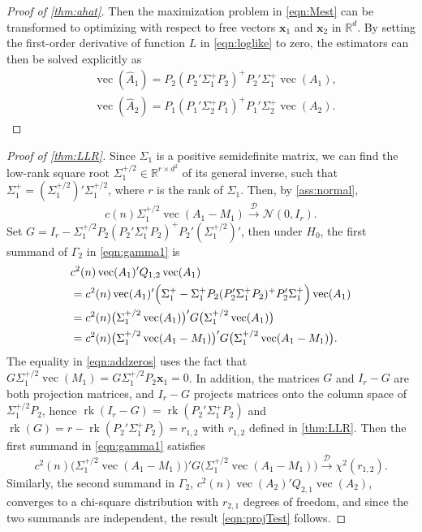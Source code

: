 \documentclass[12pt]{article}
\numberwithin{equation}{section}
\numberwithin{table}{section}
\numberwithin{thm}{section}
\numberwithin{defn}{section}
\numberwithin{lem}{section}
\numberwithin{prop}{section}
\numberwithin{cor}{section}
\numberwithin{rem}{section}
\DeclareMathOperator{\Vector}{vec}
\newcommand{\rank}{\operatorname{rk}}
\begin{document}
\begin{appendix}
\begin{proof}[Proof of \autoref{thm:ahat}]
Then the maximization problem in \eqref{eqn:Mest} can be transformed to optimizing with respect to free vectors $\bm{x}_1$ and $\bm{x}_2$ in $\mathbb{R}^d$. By setting the first-order derivative of function $L$ in \eqref{eqn:loglike} to zero, the estimators can then be solved explicitly as
\begin{align*}
    & \Vector(\widehat{A}_1) = P_2 (P_2' \Sigma_1^+ P_2)^+ P_2' \Sigma_1^+ \Vector(A_1),\\
    & \Vector(\widehat{A}_2) = P_1 (P_1' \Sigma_2^+ P_1)^+ P_1' \Sigma_2^+ \Vector(A_2).
\end{align*}
\end{proof}



\begin{proof}[Proof of \autoref{thm:LLR}]
Since $\Sigma_1$ is a positive semidefinite matrix, we can find the low-rank square root $\Sigma_1^{+/2} \in \mathbb{R}^{r \times d^2}$ of its general inverse, such that $\Sigma_1^+ = (\Sigma_1^{+/2})' \Sigma_1^{+/2}$, where $r$ is the rank of $\Sigma_1$. Then, by \autoref{ass:normal},
$$
c(n) \Sigma_1^{+/2} \Vector(A_1 - M_1) \xrightarrow{\mathcal{D}} \mathcal{N}(0, I_{r}).
$$
Set $G = I_{r} - \Sigma_1^{+/2} P_2 (P_2' \Sigma_1^+ P_2)^+ P_2' (\Sigma_1^{+/2})'$, then under $H_0$, the first summand of $\Gamma_2$ in \eqref{eqn:gamma1} is
\begin{align}
    &c^2(n) \Vector (A_1)' Q_{1,2} \Vector(A_1) \nonumber\\
    & = c^2(n) \Vector (A_1)' \Big(\Sigma_1^+ - \Sigma_1^+ P_2 (P_2' \Sigma_1^+ P_2)^+ P_2' \Sigma_1^+\Big) \Vector(A_1) \nonumber\\
    & = c^2(n) \big(\Sigma_1^{+/2} \Vector(A_1)\big)' G \big(\Sigma_1^{+/2} \Vector(A_1)\big) \notag \\
    & = c^2(n) \big(\Sigma_1^{+/2} \Vector(A_1 - M_1)\big)' G \big(\Sigma_1^{+/2} \Vector(A_1 - M_1)\big).\label{eqn:addzeros}
\end{align}
The equality in \eqref{eqn:addzeros} uses the fact that $G \Sigma_1^{+/2} \Vector(M_1) = G \Sigma_1^{+/2} P_2 \bm{x}_1 = 0$. In addition, the matrices $G$ and $I_{r} - G$ are both projection matrices, and $I_{r} - G$ projects matrices onto the column space of $\Sigma_1^{+/2} P_2$, hence $\rank(I_{r} - G) = \rank(P_2' \Sigma_1^+ P_2)$ and $\rank(G) = r - \rank(P_2' \Sigma_1^+ P_2) = r_{1,2}$ with $r_{1,2}$ defined in \autoref{thm:LLR}. Then the first summand in \eqref{eqn:gamma1} satisfies
$$
c^2(n) \big(\Sigma_1^{+/2} \Vector(A_1 - M_1)\big)' G \big(\Sigma_1^{+/2} \Vector(A_1 - M_1)\big) \xrightarrow{\mathcal{D}} \chi^2(r_{1,2}).
$$
Similarly, the second summand in $\Gamma_2$, $c^2(n) \Vector (A_2)' Q_{2,1} \Vector(A_2)$, converges to a chi-square distribution with $r_{2,1}$ degrees of freedom, and since the two summands are independent, the result \eqref{eqn:projTest} follows.
\end{proof}



\end{appendix}
\end{document}
